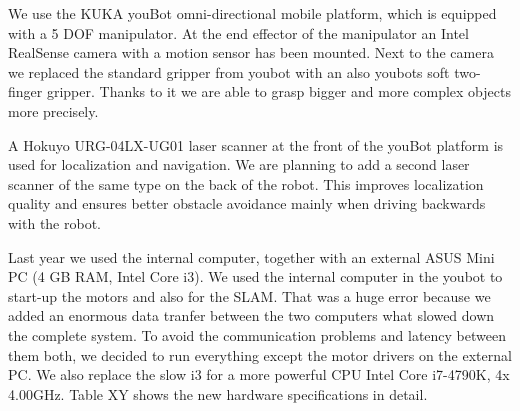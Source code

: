We use the KUKA youBot omni-directional mobile platform, which is equipped with a 5 DOF manipulator. At the end effector of the manipulator an Intel RealSense camera with a motion sensor has been mounted. Next to the camera we replaced the standard gripper from youbot with an also youbots soft two-finger gripper. Thanks to it we are able to grasp bigger and more complex objects more precisely.

A Hokuyo URG-04LX-UG01 laser scanner at the front of the youBot platform is used for localization and navigation. We are planning to add a second laser scanner of the same type on the back of the robot. This improves localization quality and ensures better obstacle avoidance mainly when driving backwards with the robot.

Last year we used the internal computer, together with an external ASUS Mini PC (4 GB RAM, Intel Core i3). We used the internal computer in the youbot to start-up the motors and also for the SLAM. That was a huge error because we added an enormous data tranfer between the two computers what slowed down the complete system. To avoid the communication problems and latency between them both, we decided to run everything except the motor drivers on the external PC. We also replace the slow i3 for a more powerful CPU Intel Core i7-4790K, 4x 4.00GHz. Table XY  shows the new hardware specifications in detail. 


